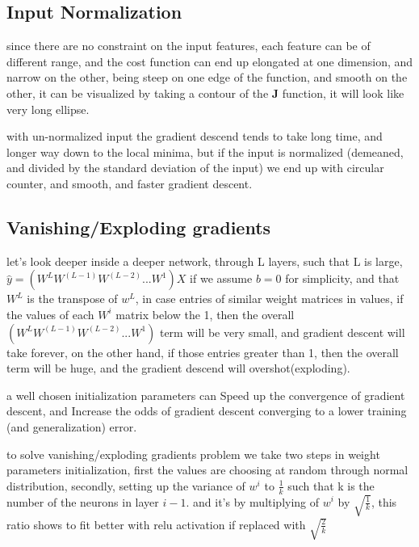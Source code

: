 \documentclass[4apaper,12pt]{book}
\begin{document}
\begin{description}
  \subsection{Input Normalization}
\item since there are no constraint on the input features, each feature can be of different range, and the cost function can end up elongated at one dimension, and narrow on the other, being steep on one edge of the function, and smooth on the other, it can be visualized by taking a contour of the \textbf{J} function, it will look like very long ellipse.
\item with un-normalized input the gradient descend tends to take long time, and longer way down to the local minima, but if the input is normalized (demeaned, and divided by the standard deviation of the input) we end up with circular counter, and smooth, and faster gradient descent.

\subsection{Vanishing/Exploding gradients}
\item let's look deeper inside a deeper network, through L layers, such that L is large, $\hat{y}=(W^LW^{(L-1)}W^{(L-2)}...W^1)X$ if we assume $b=0$ for simplicity, and that $W^L$ is the transpose of $w^L$, in case entries of similar weight matrices in values, if the values of each $W^i$ matrix below the 1, then the overall $(W^LW^{(L-1)}W^{(L-2)}...W^1)$ term will be very small, and gradient descent will take forever, on the other hand, if those entries greater than 1, then the overall term will be huge, and the gradient descend will overshot(exploding).

\item a well chosen initialization parameters can Speed up the convergence of gradient descent, and Increase the odds of gradient descent converging to a lower training (and generalization) error.

\item to solve vanishing/exploding gradients problem we take two steps in weight parameters initialization, first the values are choosing at random through normal distribution, secondly, setting up the variance of $w^i$ to $\frac{1}{k}$  such that k is the number of the neurons in layer $i-1$. and it's by multiplying of $w^i$ by $\sqrt{\frac{1}{k}}$, this ratio shows to fit better with relu activation if replaced with $\sqrt{\frac{2}{k}}$


\end{description}
\end{document}
